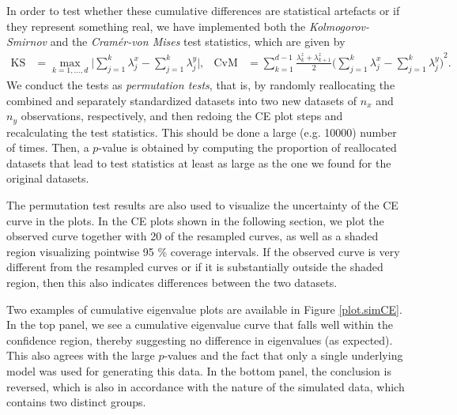 \documentclass[a4paper,12pt]{article}
\begin{document}
In order to test whether these cumulative differences are statistical artefacts or if they represent something real, we have implemented both the \emph{Kolmogorov-Smirnov} and the \emph{Cram\'er-von Mises} test statistics, which are given by
\begin{align*}
\text{KS} &= \max_{k=1,\dotsc,d} \bigg\lvert \sum_{j=1}^k \lambda_{j}^x - \sum_{j=1}^k \lambda_{j}^y \bigg\rvert, &
\text{CvM} &= \sum_{k=1}^{d-1} \frac{\lambda_k^z + \lambda_{k+1}^z}{2} {\bigg( \sum_{j=1}^k \lambda_{j}^x - \sum_{j=1}^k \lambda_{j}^y \bigg)}^2.
\end{align*}
We conduct the tests as \textit{permutation tests}, that is, by randomly reallocating the combined and separately standardized datasets into two new datasets of $n_x$ and $n_y$ observations, respectively, and then redoing the CE plot steps and recalculating the test statistics. This should be done a large (e.g. 10000) number of times. Then, a $p$-value is obtained by computing the proportion of reallocated datasets that lead to %
test statistics at least as large as %
the one we found for the original datasets.

The permutation test results are also used to visualize the uncertainty of the CE curve in the plots. In the CE plots shown in the following section, we plot the observed curve together with 20 of the resampled curves, as well as a shaded region visualizing pointwise 95 \% coverage intervals. If the observed curve is very different from the resampled curves or if it is substantially outside the shaded region, then this also indicates differences between the two datasets.

Two examples of cumulative eigenvalue plots are available in Figure \ref{plot.simCE}. In the top panel, we see a cumulative eigenvalue curve that falls well within the confidence region, thereby suggesting no difference in eigenvalues (as expected). This also agrees with the large $p$-values and the fact that only a single underlying model was used for generating this data. In the bottom panel, the conclusion is reversed, which is also in accordance with the nature of the simulated data, which contains two distinct groups.
\end{document}
